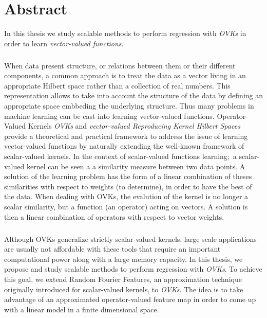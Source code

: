 



\begingroup
\let\clearpage\relax
\let\cleardoublepage\relax
\let\cleardoublepage\relax

\chapter*{Abstract}
In this thesis we study scalable methods to perform regression with
\emph{\acl{OVK}s} in order to learn \emph{vector-valued functions}.
\paragraph{}
When data present structure, or relations between them or their different
components, a common approach is to treat the data as a vector living in an
appropriate Hilbert space rather than a collection of real numbers. This
representation allows to take into account the structure of the data by
defining an appropriate space embbeding the underlying structure. Thus many
problems in machine learning can be cast into learning vector-valued functions.
Operator-Valued Kernels \emph{\acl{OVK}s} and \emph{vector-valued Reproducing
Kernel Hilbert Spaces} provide a theoretical and practical framework to address
the issue of learning vector-valued functions by naturally extending the
well-known framework of scalar-valued kernels. In the context of scalar-valued
functions learning;~a scalar-valued kernel can be seen a a similarity measure
between two data points. A solution of the learning problem has the form of a
linear combination of theses similarities with respect to weights (to
determine), in order to have the best  of the data. When dealing with
\acl{OVK}s, the evalution of the kernel is no longer a scalar similarity, but a
function (an operator) acting on vectors. A solution is then a linear
combination of operators with respect to vector weights.
\paragraph{}
Although \acl{OVK}s generalize strictly scalar-valued kernels,
large scale applications are usually not affordable with these tools that
require an important computational power along with a large memory capacity. In
this thesis, we propose and study scalable methods to perform regression with
\emph{\acl{OVK}s}. To achieve this goal, we extend Random Fourier Features, an
approximation technique originally introduced for scalar-valued kernels, to
\emph{\acl{OVK}s}. The idea is to take advantage of an approximated
operator-valued feature map in order to come up with a linear model in a finite
dimensional space.
